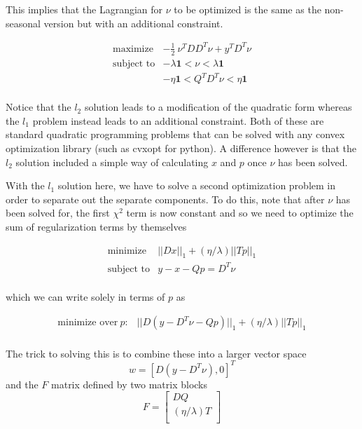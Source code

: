 \documentclass{article}
\begin{document}
This implies that the Lagrangian for $\nu$ to be optimized is the same as the non-seasonal
version but with an additional constraint.

\begin{eqnarray}
\mbox{maximize} & - \frac{1}{2} ~ \nu^T D D^T \nu + y^T D^T \nu \\
\mbox{subject to} & - \lambda \mathbf{1} < \nu < \lambda \mathbf{1} \\
& - \eta \mathbf{1} < Q^T D^T \nu < \eta \mathbf{1} \\
\end{eqnarray}

Notice that the $l_2$ solution leads to a modification of the quadratic form whereas the
$l_1$ problem instead leads to an additional constraint. Both of these are standard quadratic
programming problems that can be solved with any convex optimization library (such as cvxopt for python).
A difference however is that the $l_2$ solution included a simple way of calculating $x$ and $p$ once
$\nu$ has been solved.

With the $l_1$ solution here, we have to solve a second optimization problem
in order to separate out the separate components. To do this, note that after $\nu$ has been solved for,
the first $\chi^2$ term is now constant
and so we need to optimize the sum of regularization terms by themselves

\begin{eqnarray}
\mbox{minimize} & ||D x||_1 + (\eta / \lambda) ||T p||_1 \\
\mbox{subject to} & y - x - Qp = D^T \nu \\
\end{eqnarray}

which we can write solely in terms of $p$ as

\begin{eqnarray}
\mbox{minimize over} ~p : & ||D (y - D^T \nu - Q p)||_1 + (\eta/\lambda) ||T p||_1 \\
\end{eqnarray}

The trick to solving this is to combine these into a larger vector space
\[
w = [D (y - D^T \nu), 0]^T
\]
and the $F$ matrix defined by two matrix blocks
\begin{equation}
F=\left[
\begin{array}{c}
D Q  \\
\hline
(\eta/\lambda) T \\
\end{array}\right]
\end{equation}
\end{document}
